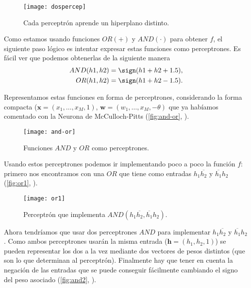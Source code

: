 \begin{figure}[htpb]
  \centering
  \texttt{[image: dospercep]}
  \caption{Cada perceptrón aprende un hiperplano distinto.}
  \label{fig:dos-percep}
\end{figure}

Como estamos usando funciones $OR (+)$ y $AND (\cdot)$ para obtener $f$, el siguiente paso lógico es intentar expresar estas funciones como perceptrones. Es fácil ver que podemos obtenerlas de la siguiente manera
\begin{align*}
  AND(h1, h2) = \sign(h1 + h2 + 1.5), \\
  OR(h1, h2) = \sign(h1 + h2 - 1.5). \\
  \label{eq:and-or}
\end{align*}

Representamos estas funciones en forma de perceptrones, considerando la forma compacta ($\textbf{x} = (x_1, \ldots, x_M, 1)$, $\textbf{w} = (w_1, \ldots, x_M, -\theta)$ que ya habíamos comentado con la Neurona de McCulloch-Pitts (\autoref{fig:and-or}, \cite{abu2012learning}).

\begin{figure}[htpb]
  \centering
  \texttt{[image: and-or]}
  \caption{Funciones $AND$ y $OR$ como perceptrones.}
  \label{fig:and-or}
\end{figure}

Usando estos perceptrones podemos ir implementando poco a poco la función $f$: primero nos encontramos con una $OR$ que tiene como entradas $h_1\overline{h_2}$ y $\overline{h_1}h_2$ (\autoref{fig:or1}, \cite{abu2012learning}).

\begin{figure}[htpb]
  \centering
  \texttt{[image: or1]}
  \caption{Perceptrón que implementa $AND(h_1\overline{h_2}, \overline{h_1}h_2)$.}
  \label{fig:or1}
\end{figure}

Ahora tendríamos que usar dos perceptrones $AND$ para implementar $h_1\overline{h_2}$ y $\overline{h_1}h_2$. Como ambos perceptrones usarán la misma entrada ($\textbf{h} = (h_1, h_2, 1)$) se pueden representar los dos a la vez mediante dos vectores de pesos distintos (que son lo que determinan al perceptrón). Finalmente hay que tener en cuenta la negación de las entradas que se puede conseguir fácilmente cambiando el signo del peso asociado (\autoref{fig:and2}, \cite{abu2012learning}).

